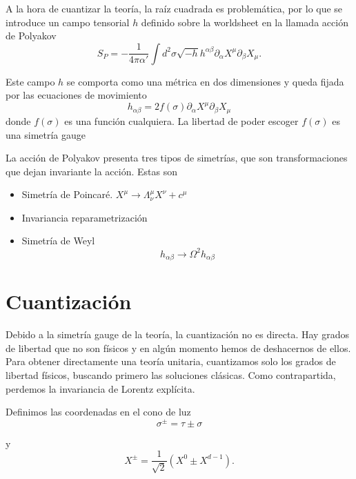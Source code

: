 A la hora de cuantizar la teoría, la raíz cuadrada es problemática, por lo que se introduce
un campo tensorial $h$ definido sobre la worldsheet en la llamada acción de Polyakov
\begin{equation}
  S_P=-\frac{1}{4\pi\alpha'}\int d^2\sigma  \sqrt{-h}h^{\alpha\beta}\partial_\alpha X^\mu \partial_\beta X_\mu.
\end{equation}

Este campo $h$ se comporta como una métrica en dos dimensiones y queda fijada por las
ecuaciones de movimiento
\begin{equation}
  h_{\alpha\beta}=2f(\sigma)\partial_\alpha X^\mu \partial_\beta X_\mu
\end{equation}
donde $f(\sigma)$ es una función cualquiera. La libertad de poder escoger $f(\sigma)$
es una simetría gauge

La acción de Polyakov presenta tres tipos de simetrías, que son transformaciones que dejan
invariante la acción. Estas son

\begin{itemize}
  \item Simetría de Poincaré. $X^\mu \to \Lambda^\mu_\nu X^\nu + c^\mu$
  \item Invariancia reparametrización 
  \item Simetría de Weyl
    \begin{equation}
      h_{\alpha\beta} \to \Omega^2 h_{\alpha\beta}
    \end{equation}
\end{itemize}



\section{Cuantización}

Debido a la simetría gauge de la teoría, la cuantización no es directa.
Hay grados de libertad que no son físicos y en algún momento hemos de deshacernos de ellos.
Para obtener directamente una teoría unitaria, cuantizamos solo los grados de libertad 
físicos, buscando primero las soluciones clásicas. 
Como contrapartida, perdemos la invariancia de Lorentz explícita.

Definimos las coordenadas en el cono de luz
\begin{equation}
  \sigma^\pm=\tau\pm\sigma
\end{equation}

y
\begin{equation}
  X^\pm=\frac{1}{\sqrt 2} (X^0 \pm X^{d-1}).
\end{equation}


